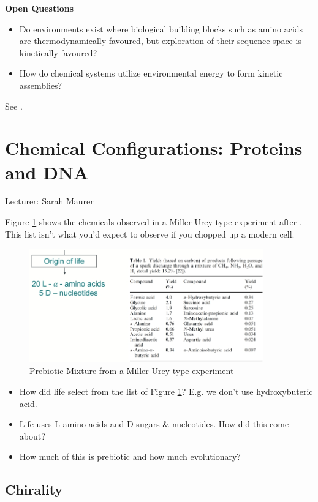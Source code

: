 \documentclass[]{article}
\begin{document}
\textbf{Open Questions}
\begin{itemize}
	\item Do environments exist where biological building blocks such as amino acids are
	thermodynamically favoured, but exploration of their sequence space is kinetically favoured?
	\item How do chemical systems utilize environmental energy to form kinetic assemblies?
\end{itemize}

See \cite{pross2017and,semenov2016autocatalytic,pross2008can,pross2005emergence}.

\section{Chemical Configurations: Proteins and DNA}

Lecturer: Sarah Maurer

Figure \ref{fig:PrebioticMix} shows the chemicals observed in a Miller-Urey type experiment after \cite{podlech2001origin}. This list isn't what you'd expect to observe if you chopped up a modern cell.
\begin{figure}[H]
	\caption{Prebiotic Mixture from a Miller-Urey type experiment} \label{fig:PrebioticMix} 
	\includegraphics[width=0.9\textwidth]{PrebioticMix}
\end{figure}

\begin{itemize}
	\item How did life select from the list of Figure \ref{fig:PrebioticMix}? E.g. we don't use hydroxybuteric acid.
	\item Life uses L amino acids and D sugars \& nucleotides. How did this come about?
	\item How much of this is prebiotic and how much evolutionary? 
\end{itemize}

\subsection{Chirality}
\end{document}
